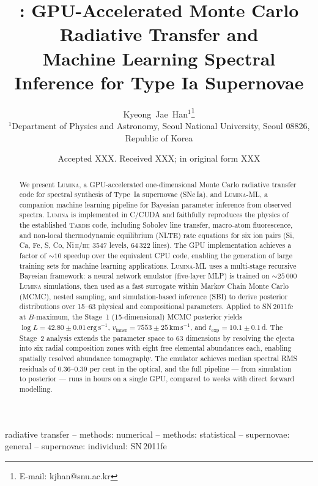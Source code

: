 \documentclass[fleqn,usenatbib]{mnras}
\title[\lumina{}: GPU Radiative Transfer \& ML Inference for SNe\,Ia]
{\lumina{}: GPU-Accelerated Monte Carlo Radiative Transfer and\\
Machine Learning Spectral Inference for Type Ia Supernovae}
\author[K.~J.~Han]{
Kyeong~Jae~Han$^{1}$\thanks{E-mail: kjhan@snu.ac.kr}
\\
$^{1}$Department of Physics and Astronomy, Seoul National University, Seoul 08826, Republic of Korea
}
\date{Accepted XXX. Received XXX; in original form XXX}
\newcommand{\lumina}{\textsc{Lumina}}
\newcommand{\luminaml}{\textsc{Lumina-ML}}
\newcommand{\tardis}{\textsc{Tardis}}
\newcommand{\kms}{\ensuremath{\,\mathrm{km\,s^{-1}}}}
\newcommand{\ergs}{\ensuremath{\,\mathrm{erg\,s^{-1}}}}
\begin{document}
\label{firstpage}
\pagerange{\pageref{firstpage}--\pageref{lastpage}}
\maketitle

\begin{abstract}
We present \lumina{}, a GPU-accelerated one-dimensional Monte Carlo radiative transfer code for spectral synthesis of Type~Ia supernovae (SNe\,Ia), and \luminaml{}, a companion machine learning pipeline for Bayesian parameter inference from observed spectra. \lumina{} is implemented in C/CUDA and faithfully reproduces the physics of the established \tardis{} code, including Sobolev line transfer, macro-atom fluorescence, and non-local thermodynamic equilibrium (NLTE) rate equations for six ion pairs (Si, Ca, Fe, S, Co, Ni\,\textsc{ii/iii}; 3547 levels, 64\,322 lines). The GPU implementation achieves a factor of ${\sim}10$ speedup over the equivalent CPU code, enabling the generation of large training sets for machine learning applications. \luminaml{} uses a multi-stage recursive Bayesian framework: a neural network emulator (five-layer MLP) is trained on ${\sim}25\,000$ \lumina{} simulations, then used as a fast surrogate within Markov Chain Monte Carlo (MCMC), nested sampling, and simulation-based inference (SBI) to derive posterior distributions over 15--63 physical and compositional parameters. Applied to SN\,2011fe at $B$-maximum, the Stage~1 (15-dimensional) MCMC posterior yields $\log L = 42.80 \pm 0.01\ergs$, $v_\mathrm{inner} = 7553 \pm 25\kms$, and $t_\mathrm{exp} = 10.1 \pm 0.1$\,d. The Stage~2 analysis extends the parameter space to 63 dimensions by resolving the ejecta into six radial composition zones with eight free elemental abundances each, enabling spatially resolved abundance tomography. The emulator achieves median spectral RMS residuals of 0.36--0.39 per cent in the optical, and the full pipeline --- from simulation to posterior --- runs in hours on a single GPU, compared to weeks with direct forward modelling.
\end{abstract}

\begin{keywords}
radiative transfer -- methods: numerical -- methods: statistical -- supernovae: general -- supernovae: individual: SN\,2011fe
\end{keywords}

\end{document}
